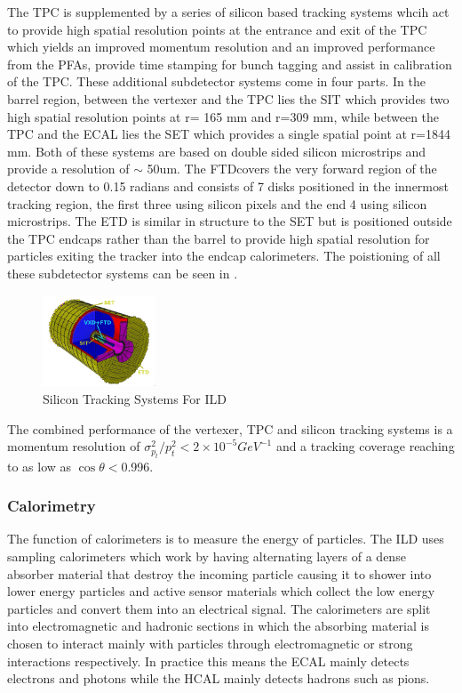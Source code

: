 The \ac{TPC} is supplemented by a series of silicon based tracking systems whcih act to provide high spatial resolution points at the entrance and exit of the TPC which yields an improved momentum resolution and an improved performance from the \ac{PFA}s, provide time stamping for bunch tagging and assist in calibration of the \ac{TPC}. These additional subdetector systems come in four parts. In the barrel region, between the vertexer and the \ac{TPC} lies the \ac{SIT} which provides two high spatial resolution points at r= 165 mm and r=309 mm, while between the \ac{TPC} and the \ac{ECAL} lies the \ac{SET} which provides a single spatial point at r=1844 mm. Both of these systems are based on double sided silicon microstrips and provide a resolution of $\sim$ 50um. The \ac{FTD}covers the very forward region of the detector down to 0.15 radians and consists of 7 disks positioned in the innermost tracking region, the first three using silicon pixels and the end 4 using silicon microstrips. The \ac{ETD} is similar in structure to the \ac{SET} but is positioned outside the \ac{TPC} endcaps rather than the barrel to provide high spatial resolution for particles exiting the tracker into the endcap calorimeters. The poistioning of all these subdetector systems can be seen in .

\begin{figure}
  \centering
  \includegraphics[width=0.3\textwidth,keepaspectratio]{Experiments/fig/SiliconTrackers}
  \caption[Silicon Tracking Systems For ILD]{Silicon Tracking Systems For ILD \cite{ILD}}
  \label{fig:silicontracking}
\end{figure}

The combined performance of the vertexer, \ac{TPC} and silicon tracking systems is a momentum resolution of $\sigma_{p_t}^2/ p_{t}^2 < 2 \times 10^{-5} GeV^{-1}$ and a tracking coverage reaching to as low as $\cos\theta<$0.996.


\subsubsection{Calorimetry}

The function of calorimeters is to measure the energy of particles. The \ac{ILD} uses sampling calorimeters which work by having alternating layers of a dense absorber material that destroy the incoming particle causing it to shower into lower energy particles and active sensor materials which collect the low energy particles and convert them into an electrical signal. The calorimeters are split into electromagnetic and hadronic sections in which the absorbing material is chosen to interact mainly with particles through electromagnetic or strong interactions respectively. In practice this means the \ac{ECAL} mainly detects electrons and photons while the \ac{HCAL} mainly detects hadrons such as pions. 

